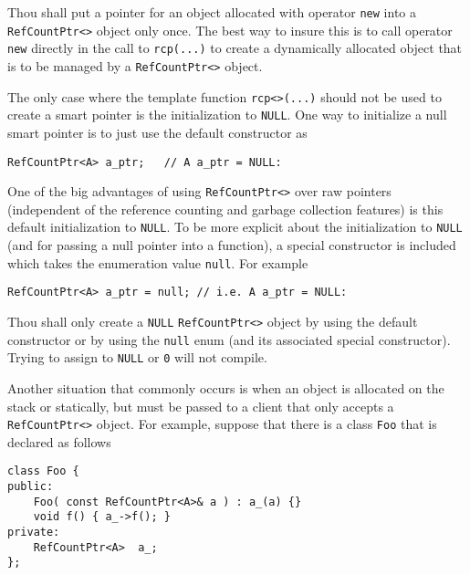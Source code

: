 \begin{commandment}\label{rcp:cmd:rcp-new}
Thou shall put a pointer for an object allocated with operator
{}\texttt{new} into a {}\texttt{Ref\-Count\-Ptr<>} object only once.  The
best way to insure this is to call operator {}\texttt{new} directly in
the call to {}\texttt{rcp(...)} to create a dynamically allocated
object that is to be managed by a {}\texttt{Ref\-Count\-Ptr<>} object.
\end{commandment}

The only case where the template function {}\texttt{rcp<>(...)} should
not be used to create a smart pointer is the initialization to
{}\texttt{NULL}.  One way to initialize a null smart pointer is to
just use the default constructor as

{\scriptsize\begin{verbatim}
RefCountPtr<A> a_ptr;   // A a_ptr = NULL:
\end{verbatim}}

One of the big advantages of using {}\texttt{Ref\-Count\-Ptr<>} over
raw pointers (independent of the reference counting and garbage
collection features) is this default initialization to
{}\texttt{NULL}.  To be more explicit about the initialization to
{}\texttt{NULL} (and for passing a null pointer into a function), a
special constructor is included which takes the enumeration value
{}\texttt{null}.  For example

{\scriptsize\begin{verbatim}
RefCountPtr<A> a_ptr = null; // i.e. A a_ptr = NULL:
\end{verbatim}}

\begin{commandment}
Thou shall only create a {}\texttt{NULL} {}\texttt{Ref\-Count\-Ptr<>}
object by using the default constructor or by using the
{}\texttt{null} enum (and its associated special constructor).  Trying
to assign to {}\texttt{NULL} or {}\texttt{0} will not compile.
\end{commandment}

Another situation that commonly occurs is when an object is allocated
on the stack or statically, but must be passed to a client that only
accepts a {}\texttt{Ref\-Count\-Ptr<>} object.  For example, suppose that
there is a class {}\texttt{Foo} that is declared as follows

{\scriptsize\begin{verbatim}
class Foo {
public:
    Foo( const RefCountPtr<A>& a ) : a_(a) {}
    void f() { a_->f(); }
private:
    RefCountPtr<A>  a_;
};
\end{verbatim}}

